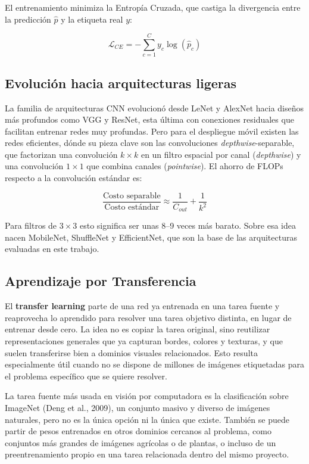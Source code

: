 \documentclass[12pt,letterpaper]{article}
\begin{document}
El entrenamiento minimiza la Entrop\'ia Cruzada, que castiga la divergencia entre la predicci\'on $\hat{p}$ y la etiqueta real $y$:

\begin{equation}
\mathcal{L}_{CE} = -\sum_{c=1}^{C} y_c \log(\hat{p}_c)
\label{eq:ce}
\end{equation}

\subsection{Evoluci\'on hacia arquitecturas ligeras}

La familia de arquitecturas CNN evolucion\'o desde LeNet y AlexNet hacia dise\~nos m\'as profundos como VGG y ResNet, esta \'ultima con conexiones residuales que facilitan entrenar redes muy profundas. Pero para el despliegue m\'ovil existen  las redes eficientes, dónde su pieza clave son las convoluciones \textit{depthwise}-separable, que factorizan una convoluci\'on $k\times k$ en un filtro espacial por canal (\textit{depthwise}) y una convoluci\'on $1\times 1$ que combina canales (\textit{pointwise}). El ahorro de FLOPs respecto a la convoluci\'on est\'andar es:

\begin{equation}
\frac{\text{Costo separable}}{\text{Costo est\'andar}} \approx \frac{1}{C_{out}} + \frac{1}{k^2}
\end{equation}

Para filtros de $3\times 3$ esto significa ser unas 8--9 veces m\'as barato. Sobre esa idea nacen MobileNet, ShuffleNet y EfficientNet, que son la base de las arquitecturas evaluadas en este trabajo.

\subsection{Aprendizaje por Transferencia}

El \textbf{transfer learning} parte de una red ya entrenada en una tarea fuente y reaprovecha lo aprendido para resolver una tarea objetivo distinta, en lugar de entrenar desde cero. La idea no es copiar la tarea original, sino reutilizar representaciones generales que ya capturan bordes, colores y texturas, y que suelen transferirse bien a dominios visuales relacionados. Esto resulta especialmente \'util cuando no se dispone de millones de im\'agenes etiquetadas para el problema espec\'ifico que se quiere resolver.

La tarea fuente m\'as usada en visi\'on por computadora es la clasificaci\'on sobre ImageNet (Deng et al., 2009), un conjunto masivo y diverso de im\'agenes naturales, pero no es la \'unica opci\'on ni la \'unica que existe. Tambi\'en se puede partir de pesos entrenados en otros dominios cercanos al problema, como conjuntos m\'as grandes de im\'agenes agr\'icolas o de plantas, o incluso de un preentrenamiento propio en una tarea relacionada dentro del mismo proyecto.
\end{document}
